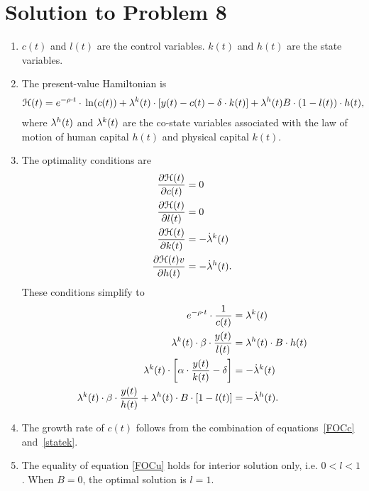 \documentclass[letterpaper,12pt,leqno]{article}
\begin{document}
\section*{Solution to Problem 8}
\begin{enumerate}
\item $c(t)$ and $l(t)$ are the control variables. $k(t)$ and $h(t)$ are the state variables.
\item The present-value Hamiltonian is
\begin{align*}
\Hc(t)=e^{-\rho \cdot t}\cdot \ln{c(t)} +\l^{k}(t)\cdot \bs{y(t)-c(t)-\d\cdot  k(t)} +\l^{h}(t) B\cdot \bp{1-l(t)}\cdot  h(t),
\end{align*}
where $\lambda^{h}(t)$ and $\lambda^{k}(t)$ are the co-state variables associated with the law of motion of human capital $h(t)$ and physical capital $k(t)$.

\item The optimality conditions are
\begin{align*}
\frac{\partial \mathcal{H}(t)}{\partial c(t)} &=0\\
\frac{\partial \mathcal{H}(t)}{\partial l(t)}&=0 \\
\frac{\partial \mathcal{H}(t)}{\partial k(t)} &=-\dot{\lambda}^{k}(t)\\
\frac{\partial \mathcal{H}(t)v}{\partial h(t)}&=-\dot{\lambda}^{h}(t).
\end{align*}
These conditions simplify to
\begin{align}
e^{-\rho \cdot t}\cdot \frac{1}{c(t)} &=\lambda^{k}(t) \label{FOCc} \\
\lambda^{k}(t)\cdot \beta \cdot\frac{ y(t)}{l(t)} &=\lambda^{h}(t)\cdot B\cdot h(t)  \label{FOCu} \\
\lambda^{k}(t)\cdot \left[ \alpha\cdot  \frac{y(t)}{k(t)}-\delta \right] &=-\dot{\lambda}^{k}(t)  \label{statek}\\
\lambda^{k}(t)\cdot \beta \cdot\frac{ y(t)}{h(t)}+\lambda^{h}(t)\cdot B\cdot \left[ 1-l(t) \right] &=-\dot{\lambda}^{h}(t)\label{stateh}.
\end{align}
\item The growth rate of $c(t)$ follows from the combination of equations~\eqref{FOCc} and~\eqref{statek}.

\item The equality of equation \eqref{FOCu} holds for
interior solution only, i.e. $0<l<1$. When $B=0$, the optimal solution is $
l=1$.


\end{enumerate}
\end{document}
